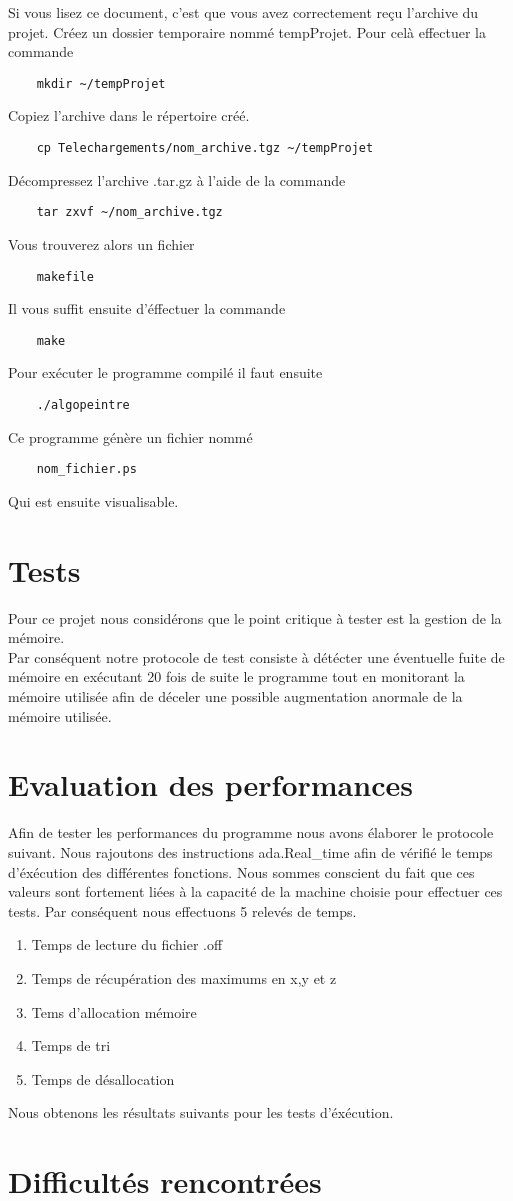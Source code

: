 \documentclass[a4paper]{article}
\begin{document}
Si vous lisez ce document, c'est que vous avez correctement reçu l'archive du projet.
\newline
Créez un dossier temporaire nommé tempProjet. Pour celà effectuer la commande
\begin{lstlisting}
	mkdir ~/tempProjet
\end{lstlisting}
Copiez l'archive dans le répertoire créé.
\begin{lstlisting}
	cp Telechargements/nom_archive.tgz ~/tempProjet
\end{lstlisting}
Décompressez l'archive .tar.gz à l'aide de la commande 
\begin{lstlisting} 
	tar zxvf ~/nom_archive.tgz
\end{lstlisting}
Vous trouverez alors un fichier 
\begin{lstlisting} 
	makefile
\end{lstlisting}
Il vous suffit ensuite d'éffectuer la commande 
\begin{lstlisting} 
	make 
\end{lstlisting}
Pour exécuter le programme compilé il faut ensuite 
\begin{lstlisting} 
	./algopeintre
\end{lstlisting}
Ce programme génère un fichier nommé
\begin{lstlisting} 
	nom_fichier.ps
\end{lstlisting}
Qui est ensuite visualisable.

\section{Tests}
Pour ce projet nous considérons que le point critique à tester est la gestion de la mémoire. \\
Par conséquent notre protocole de test consiste à détécter une éventuelle fuite de mémoire en exécutant 20 fois de suite le programme tout en monitorant la mémoire utilisée afin de déceler une possible augmentation anormale de la mémoire utilisée.


\section{Evaluation des performances}
Afin de tester les performances du programme nous avons élaborer le protocole suivant. Nous rajoutons des instructions ada.Real\_time afin de vérifié le temps d'éxécution des différentes fonctions. Nous sommes conscient du fait que ces valeurs sont fortement liées à la capacité de la machine choisie pour effectuer ces tests. Par conséquent nous effectuons 5 relevés de temps. 
\begin{enumerate}
\item Temps de lecture du fichier .off
\item Temps de récupération des maximums en x,y et z
\item Tems d'allocation mémoire
\item Temps de tri
\item Temps de désallocation
\end{enumerate}
Nous obtenons les résultats suivants pour les tests d'éxécution.



\section{Difficultés rencontrées}
 
\end{document}
